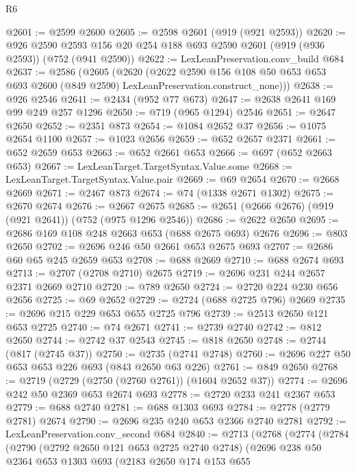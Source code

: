 \begin{lexlean}{R6}
\begin{coremodule}
@2601 := @2599 @2600
@2605 := @2598 @2601 (@919 (@921 @2593))
@2620 := @926
    @2590
    @2593
    @156
    @20
    @254
    @188
    @693
    @2590
    @2601
    (@919 (@936 @2593))
    (@752 (@941 @2590))
@2622 := LexLeanPreservation.conv_build @684
@2637 := @2586
    (@2605
      (@2620
        (@2622
          @2590
          @156
          @108
          @50
          @653
          @653
          @693
          @2600
          (@849 @2590)
          LexLeanPreservation.construct_none)))
@2638 := @926 @2546
@2641 := @2434 (@952 @77 @673)
@2647 := @2638 @2641 @169 @99 @249 @257 @1296
@2650 := @719 (@965 @1294) @2546
@2651 := @2647 @2650
@2652 := @2351 @873
@2654 := @1084 @2652 @37
@2656 := @1075 @2654 @1100
@2657 := @1023 @2656
@2659 := @652 @2657 @2371
@2661 := @652 @2659 @653
@2663 := @652 @2661 @653
@2666 := @697 (@652 @2663 @653)
@2667 := LexLeanTarget.TargetSyntax.Value.some
@2668 := LexLeanTarget.TargetSyntax.Value.pair
@2669 := @69 @2654
@2670 := @2668 @2669
@2671 := @2467 @873
@2674 := @74 (@1338 @2671 @1302)
@2675 := @2670 @2674
@2676 := @2667 @2675
@2685 := @2651 (@2666 @2676) (@919 (@921 @2641)) (@752 (@975 @1296 @2546))
@2686 := @2622 @2650
@2695 := @2686 @169 @108 @248 @2663 @653 (@688 @2675 @693) @2676
@2696 := @803 @2650
@2702 := @2696 @246 @50 @2661 @653 @2675 @693
@2707 := @2686 @60 @65 @245 @2659 @653
@2708 := @688 @2669
@2710 := @688 @2674 @693
@2713 := @2707 (@2708 @2710) @2675
@2719 := @2696 @231 @244 @2657 @2371 @2669 @2710
@2720 := @789 @2650
@2724 := @2720 @224 @230 @656 @2656
@2725 := @69 @2652
@2729 := @2724 (@688 @2725 @796) @2669
@2735 := @2696 @215 @229 @653 @655 @2725 @796
@2739 := @2513 @2650 @121 @653 @2725
@2740 := @74 @2671
@2741 := @2739 @2740
@2742 := @812 @2650
@2744 := @2742 @37 @2543
@2745 := @818 @2650
@2748 := @2744 (@817 (@2745 @37))
@2750 := @2735 (@2741 @2748)
@2760 := @2696 @227 @50 @653 @653 @226 @693 (@843 @2650 @63 @226)
@2761 := @849 @2650
@2768 := @2719 (@2729 (@2750 (@2760 @2761)) (@1604 @2652 @37))
@2774 := @2696 @242 @50 @2369 @653 @2674 @693
@2778 := @2720 @233 @241 @2367 @653
@2779 := @688 @2740
@2781 := @688 @1303 @693
@2784 := @2778 (@2779 @2781) @2674
@2790 := @2696 @235 @240 @653 @2366 @2740 @2781
@2792 := LexLeanPreservation.conv_second @684
@2840 := @2713
    (@2768
      (@2774
        (@2784
          (@2790
            (@2792 @2650 @121 @653 @2725 @2740 @2748)
            (@2696
              @238
              @50
              @2364
              @653
              @1303
              @693
              (@2183
                @2650
                @174
                @153
                @655

\end{coremodule}
\end{lexlean}
